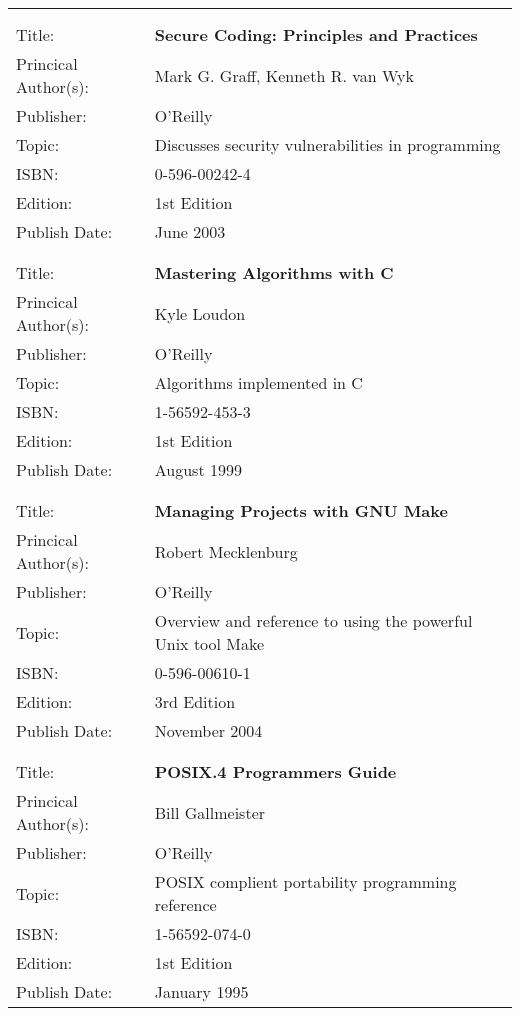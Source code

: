 \begin{tabular}{ll}
	&	\\
	&	\\

Title: &	\textbf{Secure Coding: Principles and Practices}	\\
Princical Author(s): &	Mark G. Graff, Kenneth R. van Wyk  \\
Publisher:&	O'Reilly	\\	
Topic:	&	Discusses security vulnerabilities in programming \\
ISBN:		&	0-596-00242-4 \\
Edition:	&	1st Edition \\
Publish Date:	&	June 2003 \\

	&	\\
	&	\\

Title: &	\textbf{Mastering Algorithms with C}	\\
Princical Author(s): &	Kyle Loudon  \\
Publisher:&	O'Reilly	\\	
Topic:	&	Algorithms implemented in C \\
ISBN:		&	1-56592-453-3 \\
Edition:	&	1st Edition \\
Publish Date:	&	August 1999 \\

	&	\\
	&	\\

Title: &	\textbf{Managing Projects with GNU Make}	\\
Princical Author(s): &	Robert Mecklenburg  \\
Publisher:&	O'Reilly	\\	
Topic:	&	Overview and reference to using the powerful Unix tool Make \\
ISBN:		&	0-596-00610-1 \\
Edition:	&	3rd Edition \\
Publish Date:	&	November 2004 \\

	&	\\
	&	\\
	
Title: &	\textbf{POSIX.4 Programmers Guide}	\\
Princical Author(s): &	Bill Gallmeister  \\
Publisher:&	O'Reilly	\\	
Topic:	&	POSIX complient portability programming reference \\
ISBN:		&	1-56592-074-0 \\
Edition:	&	1st Edition \\
Publish Date:	&	January 1995 \\


\end{tabular}
